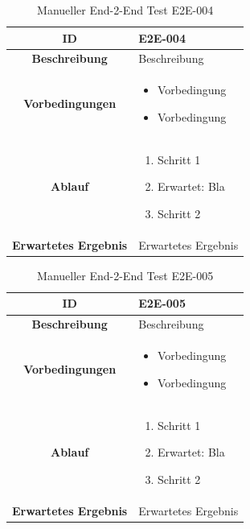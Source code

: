 \documentclass[a4paper,12pt]{report}
\begin{document}
    \begin{table}[h!]
        \centering
        \setlength{\leftmargini}{0.4cm}
        \begin{tabular}{|c|p{10cm}|}
            \hline
            \textbf{ID}           & E2E-004                                                                 \\ \hline
            \textbf{Beschreibung} & Beschreibung         \\ \hline
            \textbf{Vorbedingungen} &
            \begin{itemize}
                \item Vorbedingung
                \item Vorbedingung
            \end{itemize} \\ \hline
            \textbf{Ablauf} &
            \begin{enumerate}
                \item Schritt 1
                \item Erwartet: Bla
                \item Schritt 2
            \end{enumerate} \\ \hline
            \textbf{Erwartetes Ergebnis} & Erwartetes Ergebnis \\ \hline
        \end{tabular}
        \caption{Manueller End-2-End Test E2E-004}\label{tab:e2e-4}
    \end{table}

    \begin{table}[h!]
        \centering
        \setlength{\leftmargini}{0.4cm}
        \begin{tabular}{|c|p{10cm}|}
            \hline
            \textbf{ID}           & E2E-005                                                                 \\ \hline
            \textbf{Beschreibung} & Beschreibung         \\ \hline
            \textbf{Vorbedingungen} &
            \begin{itemize}
                \item Vorbedingung
                \item Vorbedingung
            \end{itemize} \\ \hline
            \textbf{Ablauf} &
            \begin{enumerate}
                \item Schritt 1
                \item Erwartet: Bla
                \item Schritt 2
            \end{enumerate} \\ \hline
            \textbf{Erwartetes Ergebnis} & Erwartetes Ergebnis \\ \hline
        \end{tabular}
        \caption{Manueller End-2-End Test E2E-005}\label{tab:e2e-5}
    \end{table}
\end{document}
